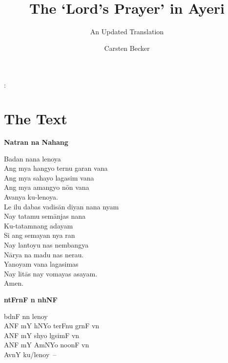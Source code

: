 \documentclass[12pt,paper=a4]{scrartcl}
\author{Carsten Becker}
\title{The ‘Lord's Prayer’ in Ayeri}
\subtitle{An Updated Translation}
\newenvironment{ayeri}{
    \Tagati
}{
}
\newenvironment{mytitle}{
    \hfill
    \begin{minipage}{0.667\textwidth}
	\vspace{\baselineskip}
	\begin{center}
	    \Large
	    \sffamily\bfseries
	    \makeatletter
}{
	    \makeatother
	\end{center}
	\vspace{1em}
    \end{minipage}
    \hfill
}
\begin{document}

\begin{mytitle}
    \@title: \@subtitle
\end{mytitle}

\section{The Text}
\begin{raggedright}
\begin{multicols}{2}
\textbf{Natran na Nahang} \\ [0.5\baselineskip]

\begin{linenumbers*}

Badan nana lenoya \\
Ang mya hangyo ternu garan vana \\
Ang mya sahayo lagasim vana \\
Ang mya amangyo nōn vana \\
Avanya ku-lenoya. \\ [0.5\baselineskip]

Le ilu dabas vadisān diyan nana nyam \\
Nay tatamu semānjas nana \\
Ku-tatamnang adayam \\
Si ang semayan nya ran \\
Nay lantoyu nas nembangya \\
Nārya na madu nas nerau. \\ [0.5\baselineskip]

Yanoyam vana lagasimas \\
Nay litās nay vomayas asayam. \\ [0.5\baselineskip]

Amen.

\end{linenumbers*}

\columnbreak

\begin{ayeri}
\textbf{ntFrnF n nhNF} \\ [0.5\baselineskip]

\begin{linenumbers*}

bdnF nn lenoy \\
ANF mY hNYo terFnu grnF vn \\
ANF mY shyo lgsimF vn \\
ANF mY AmNYo noonF vn \\
AvnY ku/lenoy~– \\ [0.5\baselineskip]


\end{linenumbers*}
\end{ayeri}
\end{multicols}
\end{raggedright}
\end{document}
